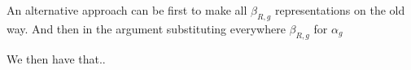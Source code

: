 
An alternative approach can be first to make all $\beta_{R,g}$ representations on the old way.
And then in the argument substituting everywhere $\beta_{R,g}$ for $\alpha_g$

We then have that..

